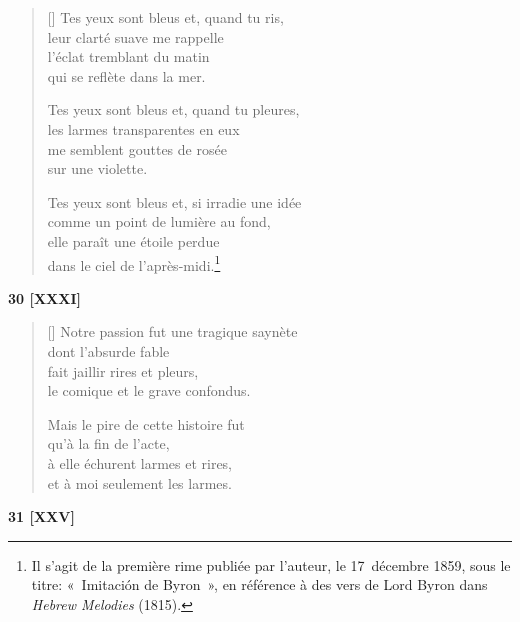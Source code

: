\documentclass[a4paper,12pt]{book}
\begin{document}
\begin{verse}[\versewidth]
  Tes yeux sont bleus et, quand tu ris, \\
  leur clarté suave me rappelle \\
  l'éclat tremblant du matin \\
  qui se reflète dans la mer.

  Tes yeux sont bleus et, quand tu pleures, \\
  les larmes transparentes en eux \\
  me semblent gouttes de rosée \\
  sur une violette.

  Tes yeux sont bleus et, si irradie une idée \\
  comme un point de lumière au fond, \\
  elle paraît une étoile perdue \\
  dans le ciel de l'après-midi.\footnote{Il s'agit de la première rime
  publiée par l'auteur, le 17~décembre 1859, sous le titre: «~Imitación
  de Byron~», en référence à des vers de Lord Byron dans \emph{Hebrew
  Melodies} (1815).}
\end{verse}

\bigskip

\begin{center}
  \textbf{30 [XXXI]}
\end{center}

\settowidth{\versewidth}{Notre passion fut une tragique saynète}

\begin{verse}[\versewidth]
  Notre passion fut une tragique saynète \\
  dont l'absurde fable \\
  fait jaillir rires et pleurs, \\
  le comique et le grave confondus.

  Mais le pire de cette histoire fut \\
  qu'à la fin de l'acte, \\
  à elle échurent larmes et rires, \\
  et à moi seulement les larmes.
\end{verse}

\bigskip

\begin{center}
  \textbf{31 [XXV]}
\end{center}
\end{document}
